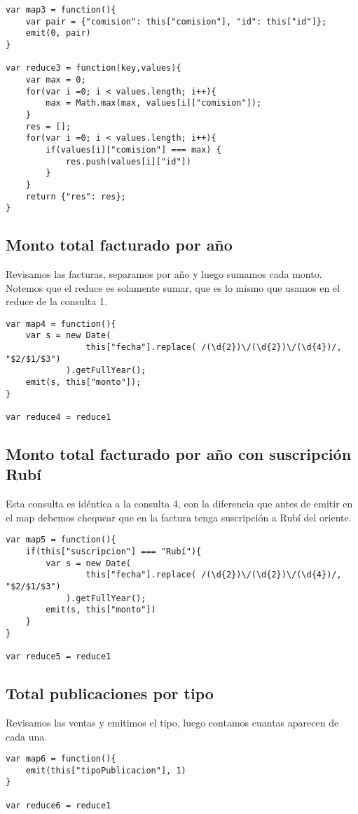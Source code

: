 \begin{verbatim}
var map3 = function(){
    var pair = {"comision": this["comision"], "id": this["id"]};
    emit(0, pair)
}

var reduce3 = function(key,values){
    var max = 0;
    for(var i =0; i < values.length; i++){
        max = Math.max(max, values[i]["comision"]);
    }
    res = [];
    for(var i =0; i < values.length; i++){
        if(values[i]["comision"] === max) {
            res.push(values[i]["id"])
        }
    }	
    return {"res": res};
}
\end{verbatim}

\subsection{Monto total facturado por año}

Revisamos las facturas, separamos por año y luego sumamos cada monto. Notemos que el reduce es solamente sumar, que es lo mismo que usamos en el reduce de la consulta 1.

\begin{verbatim}
var map4 = function(){
    var s = new Date(
                this["fecha"].replace( /(\d{2})\/(\d{2})\/(\d{4})/, "$2/$1/$3")
            ).getFullYear();
    emit(s, this["monto"]);
}

var reduce4 = reduce1
\end{verbatim}

\subsection{Monto total facturado por año con suscripción Rubí}

Esta consulta es idéntica a la consulta 4, con la diferencia que antes de emitir en el map debemos chequear que en la factura tenga suscripción a Rubí del oriente.

\begin{verbatim}
var map5 = function(){
    if(this["suscripcion"] === "Rubí"){
        var s = new Date(
                this["fecha"].replace( /(\d{2})\/(\d{2})\/(\d{4})/, "$2/$1/$3")
            ).getFullYear();
        emit(s, this["monto"])		
    }
}

var reduce5 = reduce1

\end{verbatim}

\subsection{Total publicaciones por tipo}

Revisamos las ventas y emitimos el tipo, luego contamos cuantas aparecen de cada una.

\begin{verbatim}
var map6 = function(){
    emit(this["tipoPublicacion"], 1)		
}

var reduce6 = reduce1

\end{verbatim}

